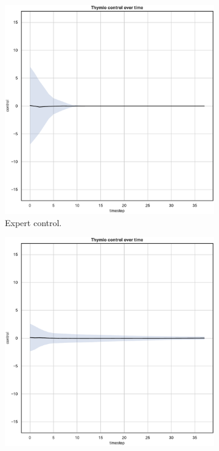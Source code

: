 \begin{figure}[!htb]
	\begin{center}
		\begin{subfigure}[h]{0.35\textwidth}
			\includegraphics[width=\textwidth]{contents/images/net-d1/control-overtime-omniscient}%
			\caption{Expert control.}
		\end{subfigure}
		\hspace{1cm}
		\begin{subfigure}[h]{0.35\textwidth}
			\includegraphics[width=\textwidth]{contents/images/net-d1/control-overtime-learned_distributed}

\end{subfigure}
\end{center}
\end{figure}
